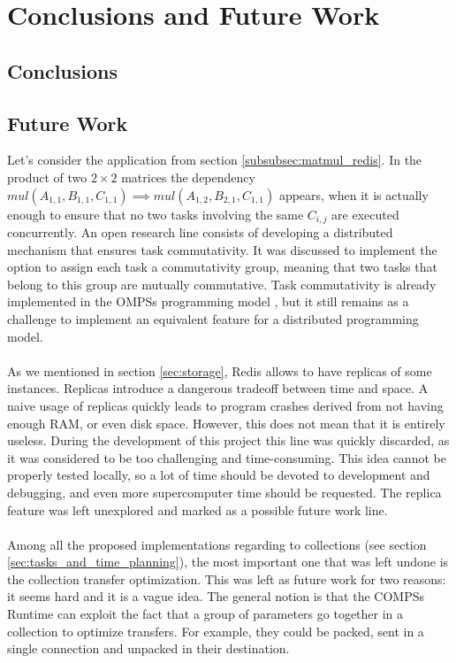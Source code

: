 \section{Conclusions and Future Work}
\subsection{Conclusions}
\label{subsec:conclusions}


\subsection{Future Work}
\label{subsec:future_work}

Let's consider the application from section \ref{subsubsec:matmul_redis}. In the product of two $2 \times 2$ matrices the dependency $mul(A_{1, 1}, B_{1, 1}, C_{1, 1}) \implies mul(A_{1,2}, B_{2, 1}, C_{1, 1})$ appears, when it is actually enough to ensure that no two tasks involving the same $C_{i, j}$ are executed concurrently. An open research line consists of developing a distributed mechanism that ensures task commutativity. It was discussed to implement the option to assign each task a commutativity group, meaning that two tasks that belong to this group are mutually commutative. Task commutativity is already implemented in the OMPSs programming model \cite{duran2011ompss}, but it still remains as a challenge to implement an equivalent feature for a distributed programming model.\\
\\
As we mentioned in section \ref{sec:storage}, Redis allows to have replicas of some instances. Replicas introduce a dangerous tradeoff between time and space. A naive usage of replicas quickly leads to program crashes derived from not having enough RAM, or even disk space. However, this does not mean that it is entirely useless. During the development of this project this line was quickly discarded, as it was considered to be too challenging and time-consuming. This idea cannot be properly tested locally, so a lot of time should be devoted to development and debugging, and even more supercomputer time should be requested. The replica feature was left unexplored and marked as a possible future work line.\\
\\
Among all the proposed implementations regarding to collections (see section \ref{sec:tasks_and_time_planning}), the most important one that was left undone is the collection transfer optimization. This was left as future work for two reasons: it seems hard and it is a vague idea. The general notion is that the COMPSs Runtime can exploit the fact that a group of parameters go together in a collection to optimize transfers. For example, they could be packed, sent in a single connection and unpacked in their destination.